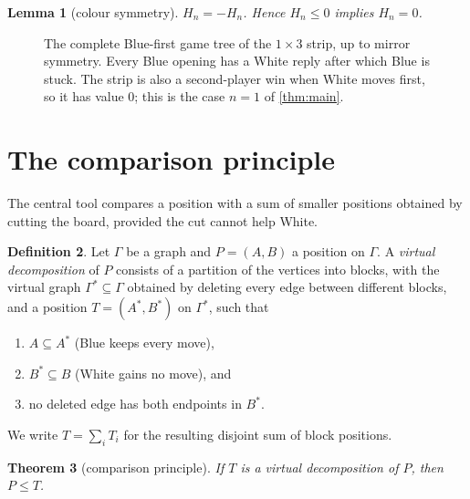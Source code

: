 \documentclass[11pt]{amsart}
\newtheorem{theorem}{Theorem}[section]
\newtheorem{lemma}[theorem]{Lemma}
\theoremstyle{definition}
\newtheorem{definition}[theorem]{Definition}
\begin{document}
\begin{lemma}[colour symmetry]\label{lem:selfconj}
$H_n=-H_n$. Hence $H_n\le 0$ implies $H_n=0$.
\end{lemma}

\begin{figure}[ht]
\centering
{}
\caption{The complete Blue-first game tree of the $1\times 3$ strip, up to
mirror symmetry. Every Blue opening has a White reply after which Blue is
stuck. The strip is also a second-player win when White moves first, so it
has value $0$; this is the case $n=1$ of \cref{thm:main}.}
\label{fig:tree}
\end{figure}

\section{The comparison principle}\label{sec:comparison}

The central tool compares a position with a sum of smaller positions obtained
by cutting the board, provided the cut cannot help White.

\begin{definition}
Let $\Gamma$ be a graph and $P=(A,B)$ a position on $\Gamma$. A \emph{virtual
decomposition} of $P$ consists of a partition of the vertices into blocks,
with the virtual graph $\Gamma^*\subseteq\Gamma$ obtained by deleting every
edge between different blocks, and a position $T=(A^*,B^*)$ on $\Gamma^*$,
such that
\begin{enumerate}[label=(C\arabic*)]
\item $A\subseteq A^*$ (Blue keeps every move),
\item $B^*\subseteq B$ (White gains no move), and
\item no deleted edge has both endpoints in $B^*$.
\end{enumerate}
We write $T=\sum_i T_i$ for the resulting disjoint sum of block positions.
\end{definition}

\begin{theorem}[comparison principle]\label{thm:comparison}
If $T$ is a virtual decomposition of $P$, then $P\le T$.
\end{theorem}
\end{document}
